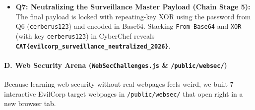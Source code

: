 \documentclass[11pt,a4paper]{article}
\begin{document}
\begin{itemize}
    \item \textbf{Q7: Neutralizing the Surveillance Master Payload (Chain Stage 5):} The final payload is locked with repeating-key XOR using the password from Q6 (\texttt{cerberus123}) and encoded in Base64. Stacking \texttt{From Base64} and \texttt{XOR} (with key \texttt{cerberus123}) in CyberChef reveals \textbf{\texttt{CAT\{evilcorp\_\allowbreak surveillance\_\allowbreak neutralized\_2026\}}}.
\end{itemize}

\paragraph{D. Web Security Arena (\texttt{WebSecChallenges.js} \& \texttt{/public/websec/})}
Because learning web security without real webpages feels weird, we built 7 interactive EvilCorp target webpages in \texttt{/public/websec/} that open right in a new browser tab.
\end{document}
